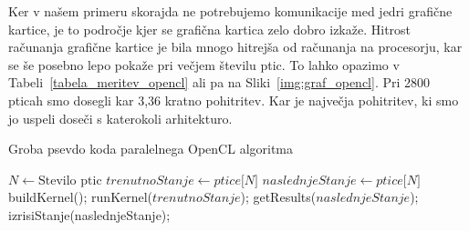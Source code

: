 \documentclass[a4paper, 12pt]{book}
\begin{document}
Ker v našem primeru skorajda ne potrebujemo komunikacije med jedri grafične kartice, je to področje kjer se grafična kartica zelo dobro izkaže. Hitrost računanja grafične kartice je bila mnogo hitrejša od računanja na procesorju, kar se še posebno lepo pokaže pri večjem številu ptic. To lahko opazimo v Tabeli~\ref{tabela_meritev_opencl} ali pa na Sliki~\ref{img:graf_opencl}. Pri 2800 pticah smo dosegli kar 3,36 kratno pohitritev. Kar je največja pohitritev, ki smo jo uspeli doseči s katerokoli arhitekturo.

\begin{algorithm}
\caption{Groba psevdo koda paralelnega OpenCL algoritma}\label{opencl_pseudo_code}
\begin{algorithmic}[1]
\State $N \gets \text{Stevilo ptic}$
\State $trenutnoStanje \gets \textit{ptice[N]}$
\State $naslednjeStanje \gets \textit{ptice[N]}$
\State buildKernel();
\Loop
\State runKernel($trenutnoStanje$);
\State getResults($naslednjeStanje$);
\State izrisiStanje(naslednjeStanje);
\EndLoop
\end{algorithmic}
\end{algorithm}

\begin{table}[]
\centering
{}
\caption{Primerjava števila okvirjev na sekundo (ang. Frames per second) v odvisnosti od velikosti jate za serijski algoritem in OpenCL algoritmom}
\label{tabela_meritev_opencl}
\end{table}
\end{document}
